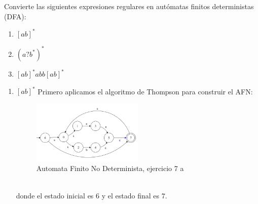 \newpage
\begin{Pro}
   Convierte las siguientes expresiones regulares en autómatas finitos deterministas (DFA):
   \begin{enumerate}
       \item $[ab]^*$
       \item $(a?b^*)^*$
       \item $[ab]^*abb[ab]^*$
    \end{enumerate}
\end{Pro}

\begin{enumerate}
    \item $[ab]^*$
    Primero aplicamos el algoritmo de Thompson para construir el AFN:
    \begin{figure}[h!]
        \centering
        \includegraphics[width=0.5\textwidth]{images/7a.png}
        \caption{Automata Finito No Determinista, ejercicio 7 a}
    \end{figure}\\
    donde el estado inicial es $6$ y el estado final es $7$.


\end{enumerate}
